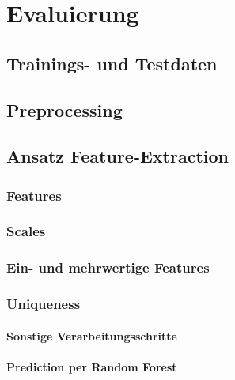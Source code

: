 
\chapter{Evaluierung}

\section{Trainings- und Testdaten}


\section{Preprocessing} 

\section{Ansatz Feature-Extraction} 

\subsection{Features}

\subsection{Scales}

\subsection{Ein- und mehrwertige Features} %

\subsection{Uniqueness}

\subsubsection{Sonstige Verarbeitungsschritte} 

\subsubsection{Prediction per Random Forest} 

